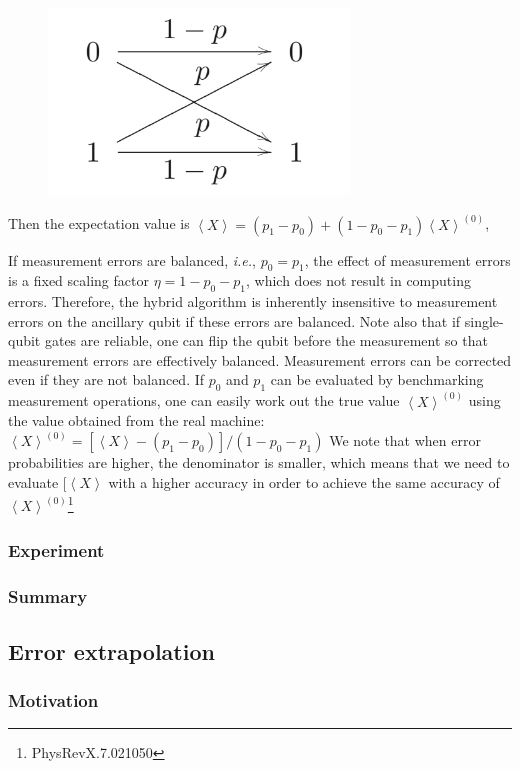 \documentclass[11pt, oneside]{article}   	%
\begin{document}
\begin{figure}[t]
\includegraphics[width=8cm]{./img/bitflip}
\centering
\end{figure}

Then the expectation value is 
$\left< X \right> = (p_1 - p_0) + (1 - p_0 - p_1) \left< X \right>^{(0)}$, 

If measurement errors are balanced, \textit{i.e.}, $p_0 = p_1$, the effect of measurement errors is a fixed scaling factor 
$\eta = 1 - p_0 - p_1$, which does not result in computing errors. 
Therefore, the hybrid algorithm is inherently insensitive to measurement errors on the ancillary qubit if these errors are balanced. 
Note also that if single-qubit gates are reliable, one can flip the qubit before the measurement so that measurement errors are effectively balanced.
Measurement errors can be corrected even if they are not balanced. 
If $p_0$ and $p_1$ can be evaluated by benchmarking measurement operations, one can easily work out the true value 
$\left< X \right>^{(0)}$ using the value obtained from the real machine: 
$\left< X \right>^{(0)} = [\left< X \right> - (p_1 - p_0)]/(1 - p_0 - p_1)$
We note that when error probabilities are higher, the denominator is smaller, which means that we need to evaluate $[\left< X \right>$ with a higher accuracy in order to achieve the same accuracy of $\left< X \right>^{(0)}$\footnote{PhysRevX.7.021050}

\subsubsection{Experiment}
\subsubsection{Summary}

\subsection{Error extrapolation}
\subsubsection{Motivation}
\end{document}
